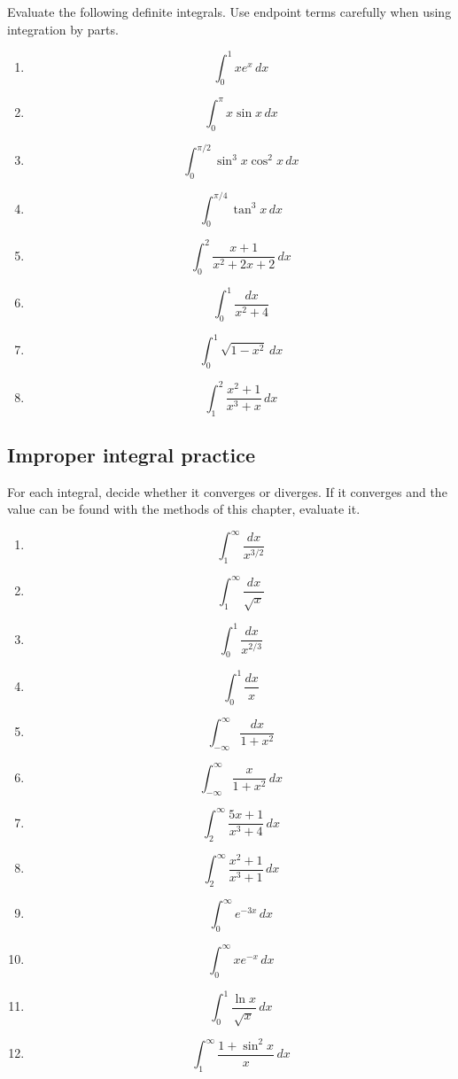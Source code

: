 Evaluate the following definite integrals.  Use endpoint terms carefully when using
integration by parts.

\begin{enumerate}
\item
\[
\int_0^1 xe^x\,dx
\]

\item
\[
\int_0^\pi x\sin x\,dx
\]

\item
\[
\int_0^{\pi/2}\sin^3x\cos^2x\,dx
\]

\item
\[
\int_0^{\pi/4}\tan^3x\,dx
\]

\item
\[
\int_0^2 \frac{x+1}{x^2+2x+2}\,dx
\]

\item
\[
\int_0^1 \frac{dx}{x^2+4}
\]

\item
\[
\int_0^1 \sqrt{1-x^2}\,dx
\]

\item
\[
\int_1^2 \frac{x^2+1}{x^3+x}\,dx
\]
\end{enumerate}

\subsection{Improper integral practice}
\label{subsec:chapter-11-improper-practice}

For each integral, decide whether it converges or diverges.  If it converges and the value
can be found with the methods of this chapter, evaluate it.

\begin{enumerate}
\item
\[
\int_1^\infty \frac{dx}{x^{3/2}}
\]

\item
\[
\int_1^\infty \frac{dx}{\sqrt{x}}
\]

\item
\[
\int_0^1 \frac{dx}{x^{2/3}}
\]

\item
\[
\int_0^1 \frac{dx}{x}
\]

\item
\[
\int_{-\infty}^{\infty}\frac{dx}{1+x^2}
\]

\item
\[
\int_{-\infty}^{\infty}\frac{x}{1+x^2}\,dx
\]

\item
\[
\int_2^\infty \frac{5x+1}{x^3+4}\,dx
\]

\item
\[
\int_2^\infty \frac{x^2+1}{x^3+1}\,dx
\]

\item
\[
\int_0^\infty e^{-3x}\,dx
\]

\item
\[
\int_0^\infty xe^{-x}\,dx
\]

\item
\[
\int_0^1 \frac{\ln x}{\sqrt{x}}\,dx
\]

\item
\[
\int_1^\infty \frac{1+\sin^2x}{x}\,dx
\]
\end{enumerate}

